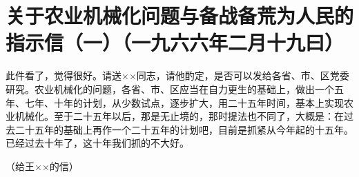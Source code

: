 \section[关于农业机械化问题与备战备荒为人民的指示信（一）（一九六六年二月十九曰）]{关于农业机械化问题与备战备荒为人民的指示信（一）（一九六六年二月十九曰）}


此件看了，觉得很好。请送××同志，请他酌定，是否可以发给各省、市、区党委研究。农业机械化的问题，各省、市、区应当在自力更生的基础上，做出一个五年、七年、十年的计划，从少数试点，逐步扩大，用二十五年时间，基本上实现农业机械化。至于二十五年以后，那是无止境的，那时提法也不同了，大概是：在过去二十五年的基础上再作一个二十五年的计划吧，目前是抓紧从今年起的十五年。已经过去十年了，这十年我们抓的不大好。

（给王××的信）

